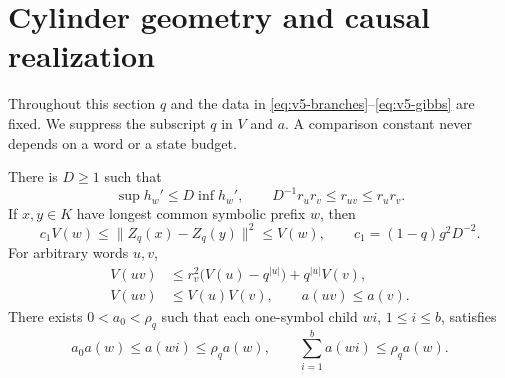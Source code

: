 \section{Cylinder geometry and causal realization}\label{sec:v5-realization}
Throughout this section $q$ and the data in
\eqref{eq:v5-branches}--\eqref{eq:v5-gibbs} are fixed. We suppress the
subscript $q$ in $V$ and $a$. A comparison constant never depends on a
word or a state budget.

\begin{lemma}\label{lem:v5-cylinder}
There is $D\ge1$ such that
\begin{equation}\label{eq:v5-distortion}
 \sup h_w'\le D\inf h_w',\qquad
 D^{-1}r_u r_v\le r_{uv}\le r_u r_v.
\end{equation}
If $x,y\in K$ have longest common symbolic prefix $w$, then
\begin{equation}\label{eq:v5-orbitseparation}
 c_1V(w)\le\|Z_q(x)-Z_q(y)\|^2\le V(w),
 \qquad c_1=(1-q)g^2D^{-2}.
\end{equation}
For arbitrary words $u,v$,
\begin{align}
 V(uv)&\le r_v^2\bigl(V(u)-q^{|u|}\bigr)+q^{|u|}V(v),
       \label{eq:v5-concat}\\
 V(uv)&\le V(u)V(v),\qquad a(uv)\le a(v).
       \label{eq:v5-suffixdomination}
\end{align}
There exists $0<a_0<\rho_q$ such that each one-symbol child
$wi$, $1\le i\le b$, satisfies
\begin{equation}\label{eq:v5-treebounds}
 a_0a(w)\le a(wi)\le\rho_q a(w),\qquad
 \sum_{i=1}^{b}a(wi)\le\rho_q a(w).
\end{equation}
\end{lemma}

